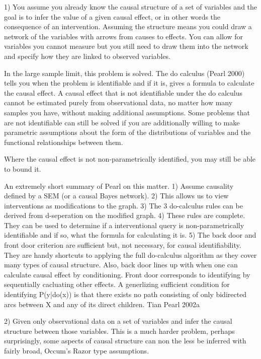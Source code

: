 \documentclass[11pt,a4paper]{article}
\begin{document}
1) You assume you already know the causal structure of a set of variables and the goal is to infer the value of a given causal effect, or in other words the consequence of an intervention. Assuming the structure means you could draw a network of the variables with arrows from causes to effects. You can allow for variables you cannot measure but you still need to draw them into the network and specify how they are linked to observed variables.

In the large sample limit, this problem is solved. The do calculus (Pearl 2000) tells you when the problem is identifiable and if it is, gives a formula to calculate the causal effect. A causal effect that is not identifiable under the do calculus cannot be estimated purely from observational data, no matter how many samples you have, without making additional assumptions. Some problems that are not identifiable can still be solved if you are additionally willing to make parametric assumptions about the form of the distributions of variables and the functional relationships between them.

Where the causal effect is not non-parametrically identified, you may still be able to bound it. 


An extremely short summary of Pearl on this matter. 1) Assume causality defined by a SEM (or a causal Bayes network). 2) This allows us to view interventions as modifications to the graph. 3) The 3 do-calculus rules can be derived from d-seperation on the modified graph. 4) These rules are complete. They can be used to determine if a interventional query is non-parametrically identifiable and if so, what the formula for calculating it is. 5) The back door and front door criterion are sufficient but, not necessary, for causal identifiability. They are handy shortcuts to applying the full do-calculus algorithm as they cover many types of causal structure. Also, back door lines up with when one can calculate causal effect by conditioning. Front door corresponds to identifying by sequentially cacluating other effects. A generlizing sufficient condition for identifying P(y|do(x)) is that there exists no path consisting of only bidirected arcs between X and any of its direct children. Tian  Pearl 2002a 



2) Given only observational data on a set of variables and infer the causal structure between those variables. This is a much harder problem, perhaps surprisingly, some aspects of causal structure can non the less be inferred with fairly broad, Occum's Razor type assumptions. 
\end{document}
